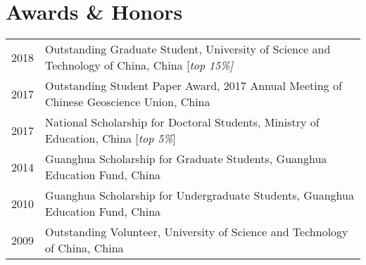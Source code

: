\section*{Awards \& Honors}

\begin{tabular}{p{} p{}}
2018 & Outstanding Graduate Student, University of Science and Technology of China, China [\textit{top 15\%]} \\
2017 & Outstanding Student Paper Award, 2017 Annual Meeting of Chinese Geoscience Union, China \\
2017 & National Scholarship for Doctoral Students, Ministry of Education, China [\textit{top 5\%}] \\
2014 & Guanghua Scholarship for Graduate Students, Guanghua Education Fund, China \\
2010 & Guanghua Scholarship for Undergraduate Students, Guanghua Education Fund, China \\
2009 & Outstanding Volunteer, University of Science and Technology of China, China \\
\end{tabular}
